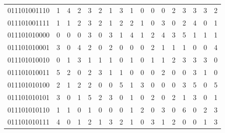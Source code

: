 \documentclass[10pt,a4paper]{article}
\begin{document}
\begin{longtable}{ |c|c|c|c|c|c|c|c|c|c|c|c|c|c|c|c|c| }
    011101001110              & 1                            & 4                                & 2                            & 3                              & 2   & 1   & 3   & 1   & 0   & 0   & 0   & 2   & 3   & 3   & 3   & 2   \\
    011101001111              & 1                            & 1                                & 2                            & 3                              & 2   & 1   & 2   & 2   & 1   & 0   & 3   & 0   & 2   & 4   & 0   & 1   \\
    011101010000              & 0                            & 0                                & 0                            & 3                              & 0   & 3   & 1   & 4   & 1   & 2   & 4   & 3   & 5   & 1   & 1   & 1   \\
    011101010001              & 3                            & 0                                & 4                            & 2                              & 0   & 2   & 0   & 0   & 0   & 2   & 1   & 1   & 1   & 0   & 0   & 4   \\
    011101010010              & 0                            & 1                                & 3                            & 1                              & 1   & 1   & 0   & 1   & 0   & 1   & 1   & 2   & 3   & 3   & 3   & 0   \\
    011101010011              & 5                            & 2                                & 0                            & 2                              & 3   & 1   & 1   & 0   & 0   & 0   & 2   & 0   & 0   & 3   & 1   & 0   \\
    011101010100              & 2                            & 1                                & 2                            & 2                              & 0   & 0   & 5   & 1   & 3   & 0   & 0   & 0   & 3   & 5   & 0   & 5   \\
    011101010101              & 3                            & 0                                & 1                            & 5                              & 2   & 3   & 0   & 1   & 0   & 2   & 0   & 2   & 1   & 3   & 0   & 1   \\
    011101010110              & 1                            & 1                                & 0                            & 1                              & 0   & 0   & 0   & 1   & 2   & 0   & 3   & 0   & 6   & 0   & 2   & 3   \\
    011101010111              & 4                            & 0                                & 1                            & 2                              & 1   & 3   & 2   & 1   & 0   & 3   & 1   & 2   & 0   & 0   & 1   & 3   \\

\end{longtable}
\end{document}
